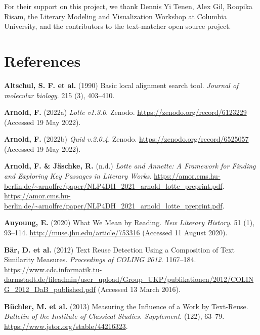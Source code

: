 \documentclass[
]{article}
\newlength{\cslhangindent}
\newlength{\cslentryspacingunit} %
\newenvironment{CSLReferences}[2] %
 {%
  \setlength{\parindent}{0pt}
  \ifodd #1
  \let\oldpar\par
  \def\par{\hangindent=\cslhangindent\oldpar}
  \fi
  \setlength{\parskip}{#2\cslentryspacingunit}
 }%
 {}
\begin{document}
For their support on this project, we thank Dennis Yi Tenen, Alex Gil,
Roopika Risam, the Literary Modeling and Visualization Workshop at
Columbia University, and the contributors to the text-matcher open
source project.

\theendnotes

\hypertarget{references}{%
\section*{References}\label{references}}

\hypertarget{refs}{}
\begin{CSLReferences}{1}{0}
\leavevmode{}%
\textbf{Altschul, S. F. et al.} (1990) Basic local alignment search
tool. \emph{Journal of molecular biology}. 215 (3), 403--410.

\leavevmode{}%
\textbf{Arnold, F.} (2022a) \emph{Lotte v1.3.0}. {Zenodo}.
\url{https://zenodo.org/record/6123229} (Accessed 19 May 2022).

\leavevmode{}%
\textbf{Arnold, F.} (2022b) \emph{Quid v.2.0.4}. {Zenodo}.
\url{https://zenodo.org/record/6525057} (Accessed 19 May 2022).

\leavevmode{}%
\textbf{Arnold, F. \& Jäschke, R.} (n.d.) \emph{Lotte and {Annette}: {A
Framework} for {Finding} and {Exploring Key Passages} in {Literary
Works}}.
\url{https://amor.cms.hu-berlin.de/~arnolfre/paper/NLP4DH_2021_arnold_lotte_preprint.pdf}.
\url{https://amor.cms.hu-berlin.de/~arnolfre/paper/NLP4DH_2021_arnold_lotte_preprint.pdf}.

\leavevmode{}%
\textbf{Auyoung, E.} (2020) What {We Mean} by {Reading}. \emph{New
Literary History}. 51 (1), 93--114.
\url{http://muse.jhu.edu/article/753316} (Accessed 11 August 2020).

\leavevmode{}%
\textbf{Bär, D. et al.} (2012) Text {Reuse Detection Using} a
{Composition} of {Text Similarity Measures}. \emph{Proceedings of COLING
2012}. 1167--184.
\url{https://www.cdc.informatik.tu-darmstadt.de/fileadmin/user_upload/Group_UKP/publikationen/2012/COLING_2012_DaB_published.pdf}
(Accessed 13 March 2016).

\leavevmode{}%
\textbf{Büchler, M. et al.} (2013) Measuring the {Influence} of a {Work}
by {Text-Reuse}. \emph{Bulletin of the Institute of Classical Studies.
Supplement}. (122), 63--79. \url{https://www.jstor.org/stable/44216323}.


\end{CSLReferences}
\end{document}

